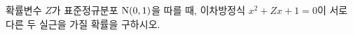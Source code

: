 확률변수 $Z$가 표준정규분포 $\mathrm{N}(0{,}\mkern3mu\mathopen{}1)$을 따를 때, 이차방정식 $x^2+Zx+1=0$이 서로 다른 두 실근을 가질 확률을 구하시오. 
